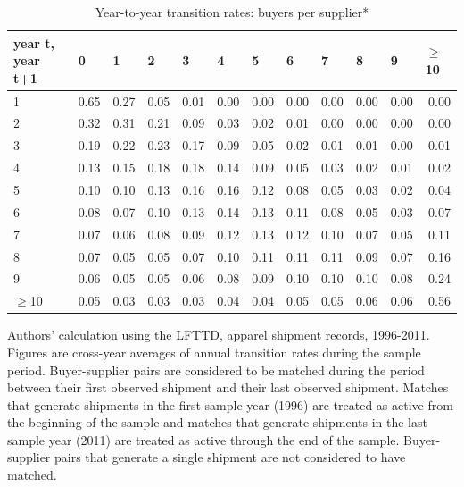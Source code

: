 \documentclass[12pt]{article} \usepackage{amsmath,amssymb,amsthm,geometry,graphicx,setspace,algorithm,algpseudocode,float}
\begin{document}
\begin{table}[htbp]
\caption{Year-to-year transition rates: buyers per supplier*}
\label{tab:buyers_per_seller_transitions}\centering
\begin{small}
\begin{tabular}{lrrrrrrrrrrr}
\toprule
year t, year t+1 & \multicolumn{1}{l}{0} & \multicolumn{1}{l}{1} & \multicolumn{1}{l}{2} & \multicolumn{1}{l}{3} & \multicolumn{1}{l}{4} & \multicolumn{1}{l}{5} & \multicolumn{1}{l}{6} & \multicolumn{1}{l}{7} & \multicolumn{1}{l}{8} & \multicolumn{1}{l}{9} & \multicolumn{1}{l}{$\geq $10 } \\ \midrule 
1 & 0.65 & 0.27 & 0.05 & 0.01 & 0.00 & 0.00 & 0.00 & 0.00 & 0.00 & 0.00 & 
0.00 \\ 
2 & 0.32 & 0.31 & 0.21 & 0.09 & 0.03 & 0.02 & 0.01 & 0.00 & 0.00 & 0.00 & 
0.00 \\ 
3 & 0.19 & 0.22 & 0.23 & 0.17 & 0.09 & 0.05 & 0.02 & 0.01 & 0.01 & 0.00 & 
0.01 \\ 
4 & 0.13 & 0.15 & 0.18 & 0.18 & 0.14 & 0.09 & 0.05 & 0.03 & 0.02 & 0.01 & 
0.02 \\ 
5 & 0.10 & 0.10 & 0.13 & 0.16 & 0.16 & 0.12 & 0.08 & 0.05 & 0.03 & 0.02 & 
0.04 \\ 
6 & 0.08 & 0.07 & 0.10 & 0.13 & 0.14 & 0.13 & 0.11 & 0.08 & 0.05 & 0.03 & 
0.07 \\ 
7 & 0.07 & 0.06 & 0.08 & 0.09 & 0.12 & 0.13 & 0.12 & 0.10 & 0.07 & 0.05 & 
0.11 \\ 
8 & 0.07 & 0.05 & 0.05 & 0.07 & 0.10 & 0.11 & 0.11 & 0.11 & 0.09 & 0.07 & 
0.16 \\ 
9 & 0.06 & 0.05 & 0.05 & 0.06 & 0.08 & 0.09 & 0.10 & 0.10 & 0.10 & 0.08 &
0.24 \\
$\geq $10 & 0.05 & 0.03 & 0.03 & 0.03 & 0.04 & 0.04 & 0.05 & 0.05 & 0.06 &
0.06 & 0.56 \\
\bottomrule
\end{tabular}%
\end{small}
\begin{tablenotes}\footnotesize
\item *Authors' calculation using the  LFTTD, apparel shipment records, 1996-2011. Figures are cross-year averages of annual transition rates during the sample period. Buyer-supplier pairs are considered to be matched during the period between their first observed shipment and their last observed shipment. Matches that generate shipments in the first sample year (1996) are treated as active from the beginning of the sample and matches that generate shipments in the last sample year (2011) are treated as active through the end of the sample. Buyer-supplier pairs that generate a single shipment are not considered to have matched.
\end{tablenotes}
\end{table}
\end{document}
